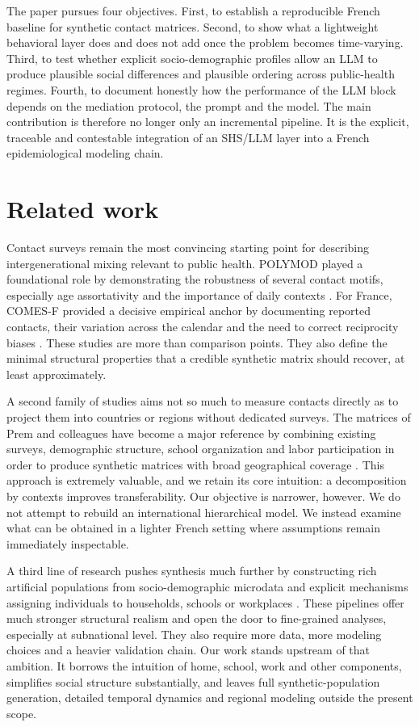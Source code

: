 \documentclass[ROIA,Unicode]{cedram}
\begin{document}
The paper pursues four objectives. First, to establish a reproducible French baseline for synthetic contact matrices. Second, to show what a lightweight behavioral layer does and does not add once the problem becomes time-varying. Third, to test whether explicit socio-demographic profiles allow an LLM to produce plausible social differences and plausible ordering across public-health regimes. Fourth, to document honestly how the performance of the LLM block depends on the mediation protocol, the prompt and the model. The main contribution is therefore no longer only an incremental pipeline. It is the explicit, traceable and contestable integration of an SHS/LLM layer into a French epidemiological modeling chain.

\section{Related work}
Contact surveys remain the most convincing starting point for describing intergenerational mixing relevant to public health. POLYMOD played a foundational role by demonstrating the robustness of several contact motifs, especially age assortativity and the importance of daily contexts \citep{mossong2008social}. For France, COMES-F provided a decisive empirical anchor by documenting reported contacts, their variation across the calendar and the need to correct reciprocity biases \citep{beraud2015french}. These studies are more than comparison points. They also define the minimal structural properties that a credible synthetic matrix should recover, at least approximately.

A second family of studies aims not so much to measure contacts directly as to project them into countries or regions without dedicated surveys. The matrices of Prem and colleagues have become a major reference by combining existing surveys, demographic structure, school organization and labor participation in order to produce synthetic matrices with broad geographical coverage \citep{prem2017projecting,prem2021projecting}. This approach is extremely valuable, and we retain its core intuition: a decomposition by contexts improves transferability. Our objective is narrower, however. We do not attempt to rebuild an international hierarchical model. We instead examine what can be obtained in a lighter French setting where assumptions remain immediately inspectable.

A third line of research pushes synthesis much further by constructing rich artificial populations from socio-demographic microdata and explicit mechanisms assigning individuals to households, schools or workplaces \citep{mistry2021inferring}. These pipelines offer much stronger structural realism and open the door to fine-grained analyses, especially at subnational level. They also require more data, more modeling choices and a heavier validation chain. Our work stands upstream of that ambition. It borrows the intuition of home, school, work and other components, simplifies social structure substantially, and leaves full synthetic-population generation, detailed temporal dynamics and regional modeling outside the present scope.
\end{document}
